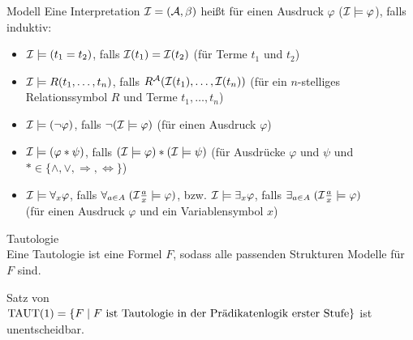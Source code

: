 \begin{Def}{Modell}
    Eine Interpretation $\mathcal{I} = (\mathcal{A}, \beta)$ heißt  für einen Ausdruck $\varphi$
    ($\mathcal{I} \models \varphi$), falls induktiv:
    \begin{itemize}
        \item
        $\mathcal{I} \models (t_1 = t_2)$, falls $\mathcal{I}(t_1) = \mathcal{I}(t_2)$
        (für Terme $t_1$ und $t_2$)

        \item
        $\mathcal{I} \models R(t_1, \dotsc, t_n)$, falls $R^{\mathcal{A}}(\mathcal{I}(t_1), \dotsc, \mathcal{I}(t_n))$
        (für ein $n$-stelliges Relationssymbol $R$ und Terme $t_1, \dotsc, t_n$)

        \item
        $\mathcal{I} \models (\lnot\varphi)$, falls $\lnot(\mathcal{I} \models \varphi)$
        (für einen Ausdruck $\varphi$)

        \item
        $\mathcal{I} \models (\varphi \ast \psi)$, falls $(\mathcal{I} \models \varphi) \ast (\mathcal{I} \models \psi)$
        (für Ausdrücke $\varphi$ und $\psi$ und
        $\ast \in \{\land, \lor, \Rightarrow, \Leftrightarrow\}$)

        \item
        $\mathcal{I} \models \forall_x \varphi$, falls
        $\forall_{a \in A}\; (\mathcal{I}\frac{a}{x} \models \varphi)$, bzw.
        $\mathcal{I} \models \exists_x \varphi$, falls
        $\exists_{a \in A}\; (\mathcal{I}\frac{a}{x} \models \varphi)$\\
        (für einen Ausdruck $\varphi$ und ein Variablensymbol $x$)
    \end{itemize}
\end{Def}

\linie
\pagebreak

\begin{Def}{Tautologie}\\
    Eine Tautologie ist eine Formel $F$, sodass alle passenden Strukturen Modelle für $F$ sind.
\end{Def}

\begin{Satz}{Satz von \upshape\,\!}\\
    $\text{TAUT}(1) = \{F \;|\; F \text{ ist Tautologie in der Prädikatenlogik erster Stufe}\}$
    ist unentscheidbar.
\end{Satz}

